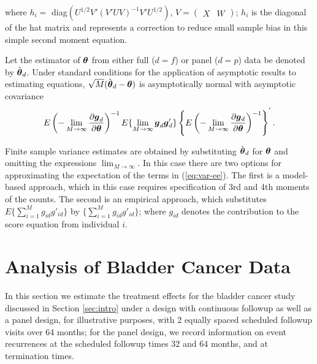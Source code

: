 \documentclass[12pt]{article}
\def \thet{\mbox{\boldmath $\theta$ \unboldmath}\!\!}
\def \g{\mbox{\boldmath $g$ \unboldmath}\!\!}
\begin{document}
\noindent where  $h_{i}=$ diag$(U^{1/2}V'(V'U V)^{-1} V'U^{1/2})$, $V=(\begin{array}{ccc}X & W \end{array})$; $h_i$ is the
diagonal of
the hat matrix and represents a correction to reduce small sample bias in this simple second moment equation.


Let the estimator of $\thet$ from either full ($d=f$) or panel ($d=p$) data be denoted by $\hat{\thet}_d$. Under standard conditions for the application of asymptotic results to estimating
equations, $\sqrt{M}(\hat{\thet}_d-\thet)$
is asymptotically normal with asymptotic covariance
\begin{equation}
 E\left(-\lim_{M\rightarrow\infty}\frac{\partial
{\g}_{d}}{\partial\thet}\right)^{-1}
   E\{\lim_{M\rightarrow\infty}{\g}_{d}{\g}_{d}'\}\left\{ E
   \left(-\lim_{M\rightarrow\infty}\frac{\partial\g_{d}}{\partial\thet}
   \right)^{-1}\right\}^{'}.
\label{eq:var-ee}
\end{equation}


\noindent Finite sample variance estimates are obtained by substituting $\hat{\thet}_d$
for $\thet$ and omitting the expressions
$\lim_{M\rightarrow\infty}$. In  this case there are two options for approximating the expectation of the terms in (\ref{eq:var-ee}). The first is a model-based approach, which in this case requires specification of 3rd and 4th moments of the counts. The second is an empirical approach, which substitutes $E\{ \sum^M_{i=1} g_{id} g'_{id}\}$ by $\{ \sum^M_{i=1} g_{id} g'_{id}\}$; where $g_{id}$ denotes the contribution to the score equation from individual $i$.



\section{Analysis of Bladder Cancer Data}\label{sec:example}

In this section we estimate the treatment effects for the bladder cancer study \citep{andrews2000data} discussed in Section \ref{sec:intro} under a design with continuous followup as well as a panel design, for illustrative purposes, with 2 equally spaced scheduled followup visits over 64 months; for the panel design, we record information on event recurrences at the scheduled followup times 32 and 64 months, and at termination times. 
\end{document}
